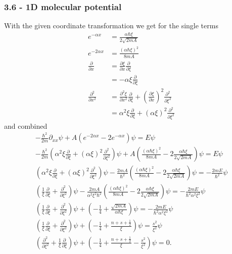 \documentclass[10pt,a4paper]{book}
\theoremstyle{definition}
\begin{document}
\subsubsection{3.6 - 1D molecular potential}
With the given coordinate transformation we get for the single terms
\begin{align}
    e^{-\alpha x}&=\frac{\alpha\hbar\xi}{2\sqrt{2mA}}\\
    e^{-2\alpha x}&=\frac{(\alpha\hbar\xi)^2}{8mA}\\
    \frac{\partial}{\partial x}&=\frac{\partial\xi}{\partial x}\frac{\partial}{\partial\xi}\\
    &=-\alpha\xi\frac{\partial}{\partial\xi}\\
    \frac{\partial^2}{\partial x^2}&=\frac{\partial^2\xi}{\partial x^2}\frac{\partial}{\partial\xi}+\left(\frac{\partial\xi}{\partial x}\right)^2\frac{\partial^2}{\partial\xi^2}\\
    &=\alpha^2\xi\frac{\partial}{\partial\xi}+(\alpha\xi)^2\frac{\partial^2}{\partial\xi^2}
\end{align}
and combined
\begin{align}
    -\frac{\hbar^2}{2m}\partial_{xx}\psi+A(e^{-2\alpha x}-2e^{-\alpha x})\psi=E\psi\\
    -\frac{\hbar^2}{2m}\left(\alpha^2\xi\frac{\partial}{\partial\xi}+(\alpha\xi)^2\frac{\partial^2}{\partial\xi^2}\right)\psi+A\left(\frac{(\alpha\hbar\xi)^2}{8mA}-2\frac{\alpha\hbar\xi}{2\sqrt{2mA}}\right)\psi=E\psi\\
    \left(\alpha^2\xi\frac{\partial}{\partial\xi}+(\alpha\xi)^2\frac{\partial^2}{\partial\xi^2}\right)\psi-\frac{2mA}{\hbar^2}\left(\frac{(\alpha\hbar\xi)^2}{8mA}-2\frac{\alpha\hbar\xi}{2\sqrt{2mA}}\right)\psi=-\frac{2mE}{\hbar^2}\psi\\
    \left(\frac{1}{\xi}\frac{\partial}{\partial\xi}+\frac{\partial^2}{\partial\xi^2}\right)\psi-\frac{2mA}{\alpha^2\xi^2\hbar^2}\left(\frac{(\alpha\hbar\xi)^2}{8mA}-2\frac{\alpha\hbar\xi}{2\sqrt{2mA}}\right)\psi=-\frac{2mE}{\hbar^2\alpha^2\xi^2}\psi\\
    \left(\frac{1}{\xi}\frac{\partial}{\partial\xi}+\frac{\partial^2}{\partial\xi^2}\right)\psi+\left(-\frac{1}{4}+\frac{\sqrt{2mA}}{\alpha\hbar\xi}\right)\psi=-\frac{2mE}{\hbar^2\alpha^2\xi^2}\psi\\
    \left(\frac{1}{\xi}\frac{\partial}{\partial\xi}+\frac{\partial^2}{\partial\xi^2}\right)\psi+\left(-\frac{1}{4}+\frac{n+s+\frac{1}{2}}{\xi}\right)\psi=\frac{s^2}{\xi^2}\psi\\
    \left(\frac{\partial^2}{\partial\xi^2}+\frac{1}{\xi}\frac{\partial}{\partial\xi}\right)\psi+\left(-\frac{1}{4}+\frac{n+s+\frac{1}{2}}{\xi}-\frac{s^2}{\xi^2}\right)\psi=0.
\end{align}
\end{document}
